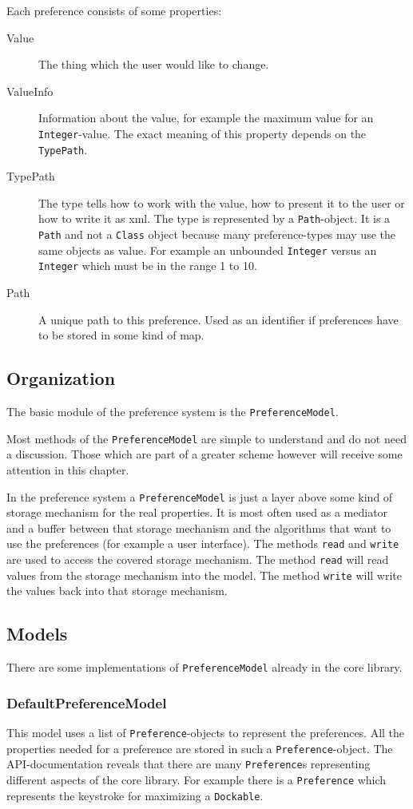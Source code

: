 \documentclass[a4paper,10pt]{article}
\newcommand{\src}[1]{\lstinline[basicstyle=\normalsize\ttfamily,keywordstyle=\normalsize\ttfamily,identifierstyle=\normalsize\ttfamily]|#1|}
\begin{document}
Each preference consists of some properties:
\begin{description}
 \item[Value] The thing which the user would like to change.
 \item[ValueInfo] Information about the value, for example the maximum value for an \src{Integer}-value. The exact meaning of this property depends on the \src{TypePath}.
 \item[TypePath] The type tells how to work with the value, how to present it to the user or how to write it as xml. The type is represented by a \src{Path}-object. It is a \src{Path} and not a \src{Class} object because many preference-types may use the same objects as value. For example an unbounded \src{Integer} versus an \src{Integer} which must be in the range 1 to 10.
 \item[Path] A unique path to this preference. Used as an identifier if preferences have to be stored in some kind of map.
\end{description}

\subsection{Organization}
The basic module of the preference system is the \src{PreferenceModel}. 

Most methods of the \src{PreferenceModel} are simple to understand and do not need a discussion. Those which are part of a greater scheme however will receive some attention in this chapter.

In the preference system a \src{PreferenceModel} is just a layer above some kind of storage mechanism for the real properties. It is most often used as a mediator and a buffer between that storage mechanism and the algorithms that want to use the preferences (for example a user interface). The methods \src{read} and \src{write} are used to access the covered storage mechanism. The method \src{read} will read values from the storage mechanism into the model. The method \src{write} will write the values back into that storage mechanism.

\subsection{Models}
There are some implementations of \src{PreferenceModel} already in the core library.

\subsubsection{DefaultPreferenceModel}
This model uses a list of \src{Preference}-objects to represent the preferences. All the properties needed for a preference are stored in such a \src{Preference}-object. The API-documentation reveals that there are many \src{Preference}s representing different aspects of the core library. For example there is a \src{Preference} which represents the keystroke for maximizing a \src{Dockable}.
\end{document}
